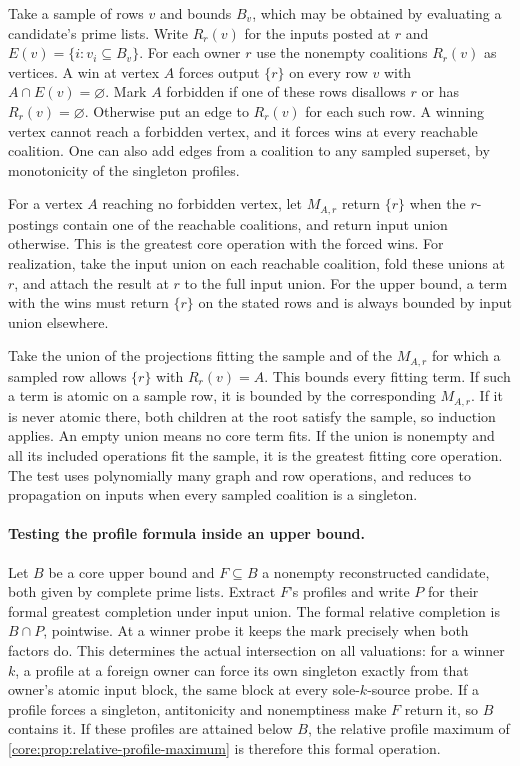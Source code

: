 Take a sample of rows $v$ and bounds $B_v$, which may
be obtained by evaluating a candidate's prime lists.
Write $R_r(v)$ for the inputs posted at $r$ and
$E(v)=\{i:v_i\subseteq B_v\}$. For each owner $r$ use
the nonempty coalitions $R_r(v)$ as vertices. A win at
vertex $A$ forces output $\{r\}$ on every row $v$ with
$A\cap E(v)=\varnothing$. Mark $A$ forbidden if one
of these rows disallows $r$ or has $R_r(v)=\varnothing$.
Otherwise put an edge to $R_r(v)$ for each such row.
A winning vertex cannot reach a forbidden vertex,
and it forces wins at every reachable coalition.
One can also add edges from a coalition to any sampled
superset, by monotonicity of the singleton profiles.

For a vertex $A$ reaching no forbidden vertex, let
$M_{A,r}$ return $\{r\}$ when the $r$-postings contain
one of the reachable coalitions, and return input union
otherwise. This is the greatest core operation with
the forced wins. For realization, take the input union
on each reachable coalition, fold these unions at $r$,
and attach the result at $r$ to the full input union.
For the upper bound, a term with the wins must return
$\{r\}$ on the stated rows and is always bounded by
input union elsewhere.

Take the union of the projections fitting the sample
and of the $M_{A,r}$ for which a sampled row allows
$\{r\}$ with $R_r(v)=A$. This bounds every fitting term.
If such a term is atomic on a sample row, it is bounded
by the corresponding $M_{A,r}$. If it is never atomic
there, both children at the root satisfy the sample,
so induction applies. An empty union means no core term
fits. If the union is nonempty and all its included
operations fit the sample, it is the greatest fitting
core operation. The test uses polynomially many graph
and row operations, and reduces to propagation on inputs
when every sampled coalition is a singleton.

\paragraph{Testing the profile formula inside an upper bound.}
Let $B$ be a core upper bound and $F\subseteq B$ a
nonempty reconstructed candidate, both given by complete
prime lists. Extract $F$'s profiles and write $P$ for their
formal greatest completion under input union. The formal
relative completion is $B\cap P$, pointwise. At a winner
probe it keeps the mark precisely when both factors do.
This determines the actual intersection on all valuations:
for a winner $k$, a profile at a foreign owner can force
its own singleton exactly from that owner's atomic input
block, the same block at every sole-$k$-source probe.
If a profile forces a singleton, antitonicity and
nonemptiness make $F$ return it, so $B$ contains it.
If these profiles are attained below $B$, the relative
profile maximum of \cref{core:prop:relative-profile-maximum}
is therefore this formal operation.

